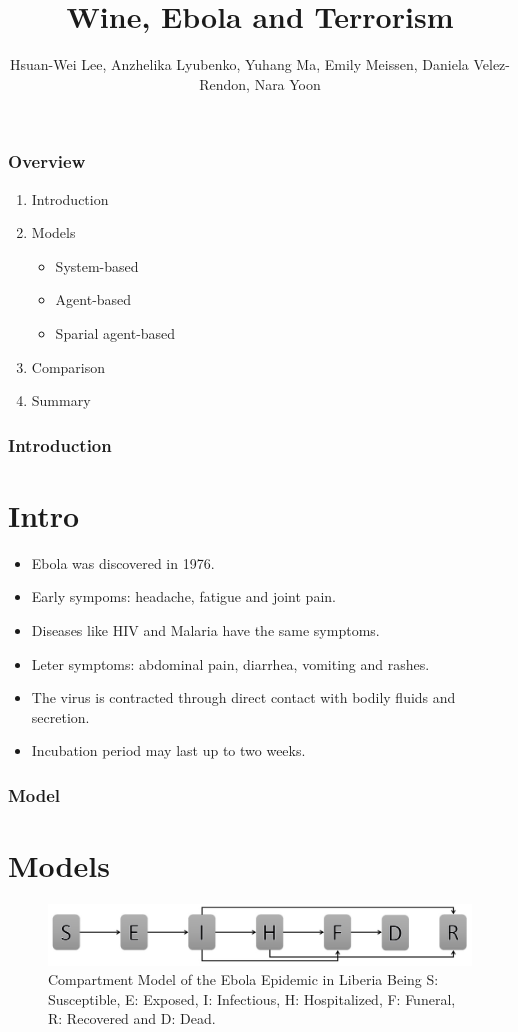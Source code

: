 \documentclass[30pt]{beamer}
\author{ Hsuan-Wei Lee,
  Anzhelika Lyubenko,
  Yuhang Ma,
  Emily Meissen,
  Daniela Velez-Rendon,
    Nara Yoon}
\title[]{Wine, Ebola and Terrorism}
\begin{document}
\begin{frame}[t,plain]
    \titlepage
\end{frame}

\begin{frame}[t,plain]
    \frametitle{Overview}
\begin{enumerate}
\vfill
\item Introduction
\item Models
\begin{itemize}
\item System-based
\item Agent-based
\item Sparial agent-based
\end{itemize}
\item Comparison
\item Summary
\end{enumerate}
\end{frame}

\begin{frame}
\frametitle{Introduction}
\section{Intro}
\begin{itemize}
\item Ebola was discovered in 1976.
\item Early sympoms:  headache, fatigue and joint pain. 
\item Diseases like HIV and Malaria have the same symptoms.
\item Leter symptoms: abdominal pain, diarrhea, vomiting and rashes. 
\item The virus is contracted through direct contact with bodily fluids and secretion.
\item Incubation period may last up to two weeks.
\end{itemize}
\end{frame}









\begin{frame}
\frametitle{Model}
\section{Models}


\begin{figure}[!h]
  \centering
  \includegraphics[width=1\textwidth]{compartmentNoFlow}
  \caption{Compartment Model of the Ebola Epidemic in Liberia \newline  Being S: Susceptible, E: Exposed, I: Infectious, H: Hospitalized, F: Funeral,  R: Recovered and D: Dead. } 
\label{fig:compartment} 
\end{figure}
\end{frame}
\end{document}
